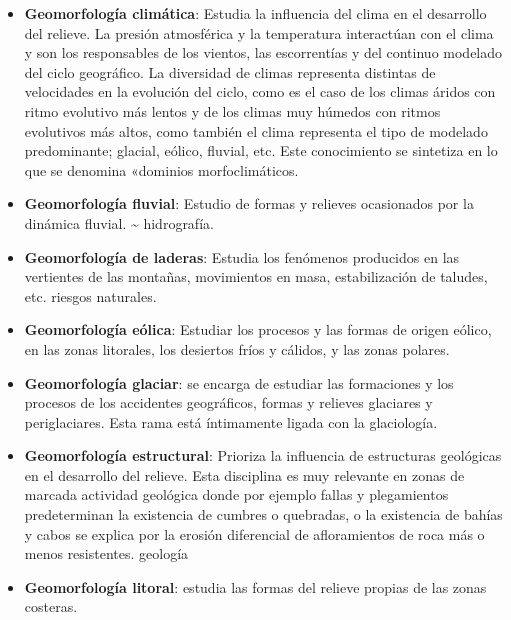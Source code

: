 \documentclass[16pt,]{krantz}
\theoremstyle{definition}
\theoremstyle{definition}
\theoremstyle{definition}
\theoremstyle{definition}
\theoremstyle{remark}
\begin{document}
\begin{itemize}
\item
  \textbf{Geomorfología climática}: Estudia la influencia del clima en el desarrollo del relieve. La presión atmosférica y la temperatura interactúan con el clima y son los responsables de los vientos, las escorrentías y del continuo modelado del ciclo geográfico. La diversidad de climas representa distintas de velocidades en la evolución del ciclo, como es el caso de los climas áridos con ritmo evolutivo más lentos y de los climas muy húmedos con ritmos evolutivos más altos, como también el clima representa el tipo de modelado predominante; glacial, eólico, fluvial, etc. Este conocimiento se sintetiza en lo que se denomina «dominios morfoclimáticos.
\item
  \textbf{Geomorfología fluvial}: Estudio de formas y relieves ocasionados por la dinámica fluvial. \textasciitilde{} hidrografía.
\item
  \textbf{Geomorfología de laderas}: Estudia los fenómenos producidos en las vertientes de las montañas, movimientos en masa, estabilización de taludes, etc. riesgos naturales.
\item
  \textbf{Geomorfología eólica}: Estudiar los procesos y las formas de origen eólico, en las zonas litorales, los desiertos fríos y cálidos, y las zonas polares.
\item
  \textbf{Geomorfología glaciar}: se encarga de estudiar las formaciones y los procesos de los accidentes geográficos, formas y relieves glaciares y periglaciares. Esta rama está íntimamente ligada con la glaciología.
\item
  \textbf{Geomorfología estructural}: Prioriza la influencia de estructuras geológicas en el desarrollo del relieve. Esta disciplina es muy relevante en zonas de marcada actividad geológica donde por ejemplo fallas y plegamientos predeterminan la existencia de cumbres o quebradas, o la existencia de bahías y cabos se explica por la erosión diferencial de afloramientos de roca más o menos resistentes. geología
\item
  \textbf{Geomorfología litoral}: estudia las formas del relieve propias de las zonas costeras.
\end{itemize}
\end{document}
